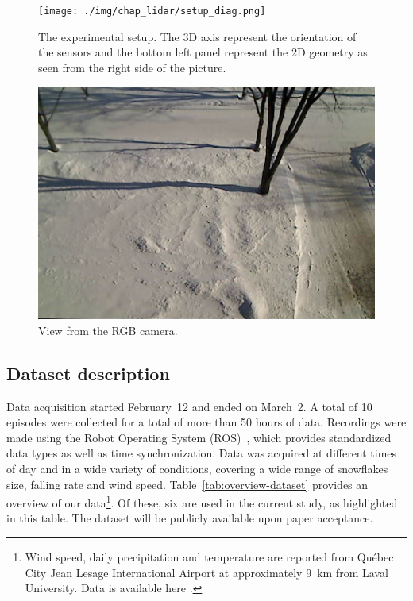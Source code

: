 \begin{figure}[th]
    \centering
    \texttt{[image: ./img/chap\_lidar/setup\_diag.png]}
    \caption{The experimental setup. The 3D axis represent the orientation of the sensors and the bottom left panel represent the 2D geometry as seen from the right side of the picture.}
    \label{fig:setup}
\end{figure}

\begin{figure}[th]
    \centering
    \includegraphics[width=0.90\linewidth]{./img/chap_lidar/camera_view.jpg}
    \caption{View from the RGB camera.}
    \label{fig:view}
\end{figure}

\subsection{Dataset description}
Data acquisition started February~12 and ended on March~2. A total of 10 episodes were collected for a total of more than 50 hours of data. Recordings were made using the Robot Operating System (ROS)~\cite{ROSWeb}, which provides standardized data types as well as time synchronization. Data was acquired at different times of day and in a wide variety of conditions, covering a wide range of snowflakes size, falling rate and wind speed.  Table~\ref{tab:overview-dataset} provides an overview of our data\footnote{Wind speed, daily precipitation and temperature are reported from Québec City Jean Lesage International Airport at approximately \SI{9}{\km} from Laval University. Data is available here \cite{WeatherCanada}.}. Of these, six are used in the current study, as highlighted in this table. The dataset will be publicly available upon paper acceptance. %

